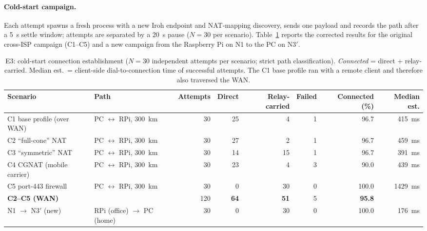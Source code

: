 \paragraph{Cold-start campaign.} Each attempt spawns a fresh process with a new Iroh endpoint and NAT-mapping discovery, sends one payload and records the path after a 5~s settle window; attempts are separated by a 20~s pause ($N{=}30$ per scenario). Table~\ref{tab:e3est} reports the corrected results for the original cross-ISP campaign (C1--C5) and a new campaign from the Raspberry Pi on N1 to the PC on N3$'$.

\begin{table}[t]
\centering
\caption{E3: cold-start connection establishment ($N{=}30$ independent attempts per scenario; strict path classification). \emph{Connected} = direct + relay-carried. Median est.\ = client-side dial-to-connection time of successful attempts. The C1 base profile ran with a remote client and therefore also traversed the WAN.}
\label{tab:e3est}
\scriptsize
\setlength{\tabcolsep}{4pt}
\begin{tabular}{l l r r r r r r}
\toprule
\textbf{Scenario} & \textbf{Path} & \textbf{Attempts} & \textbf{Direct} & \textbf{Relay-carried} & \textbf{Failed} & \textbf{Connected (\%)} & \textbf{Median est.} \\
\midrule
C1 base profile (over WAN)   & PC $\leftrightarrow$ RPi, 300~km & 30 & 25 & 4  & 1 & 96.7  & 415~ms \\
C2 ``full-cone'' NAT         & PC $\leftrightarrow$ RPi, 300~km & 30 & 27 & 2  & 1 & 96.7  & 459~ms \\
C3 ``symmetric'' NAT         & PC $\leftrightarrow$ RPi, 300~km & 30 & 14 & 15 & 1 & 96.7  & 391~ms \\
C4 CGNAT (mobile carrier)    & PC $\leftrightarrow$ RPi, 300~km & 30 & 23 & 4  & 3 & 90.0  & 439~ms \\
C5 port-443 firewall         & PC $\leftrightarrow$ RPi, 300~km & 30 & 0  & 30 & 0 & 100.0 & 1429~ms \\
\midrule
\textbf{C2--C5 (WAN)}        &                         & 120 & \textbf{64} & \textbf{51} & 5 & \textbf{95.8} & \\
\midrule
N1 $\to$ N3$'$ (new)         & RPi (office) $\to$ PC (home) & 30 & 0 & 30 & 0 & 100.0 & 176~ms \\
\bottomrule
\end{tabular}
\end{table}

